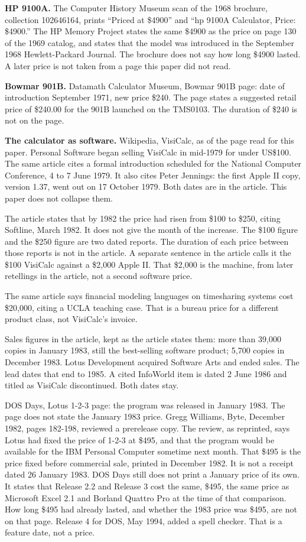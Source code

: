 \documentclass[
  10pt,
]{article}
\begin{document}
\textbf{HP 9100A.} The Computer History Museum scan of the 1968
brochure, collection 102646164, prints ``Priced at \$4900'' and ``hp
9100A Calculator, Price: \$4900.'' The HP Memory Project states the same
\$4900 as the price on page 130 of the 1969 catalog, and states that the
model was introduced in the September 1968 Hewlett-Packard Journal. The
brochure does not say how long \$4900 lasted. A later price is not taken
from a page this paper did not read.

\textbf{Bowmar 901B.} Datamath Calculator Museum, Bowmar 901B page: date
of introduction September 1971, new price \$240. The page states a
suggested retail price of \$240.00 for the 901B launched on the TMS0103.
The duration of \$240 is not on the page.

\textbf{The calculator as software.} Wikipedia, VisiCalc, as of the page
read for this paper. Personal Software began selling VisiCalc in
mid-1979 for under US\$100. The same article cites a formal introduction
scheduled for the National Computer Conference, 4 to 7 June 1979. It
also cites Peter Jennings: the first Apple II copy, version 1.37, went
out on 17 October 1979. Both dates are in the article. This paper does
not collapse them.

The article states that by 1982 the price had risen from \$100 to \$250,
citing Softline, March 1982. It does not give the month of the increase.
The \$100 figure and the \$250 figure are two dated reports. The
duration of each price between those reports is not in the article. A
separate sentence in the article calls it the \$100 VisiCalc against a
\$2,000 Apple II. That \$2,000 is the machine, from later retellings in
the article, not a second software price.

The same article says financial modeling languages on timesharing
systems cost \$20,000, citing a UCLA teaching case. That is a bureau
price for a different product class, not VisiCalc's invoice.

Sales figures in the article, kept as the article states them: more than
39,000 copies in January 1983, still the best-selling software product;
5,700 copies in December 1983. Lotus Development acquired Software Arts
and ended sales. The lead dates that end to 1985. A cited InfoWorld item
is dated 2 June 1986 and titled as VisiCalc discontinued. Both dates
stay.

DOS Days, Lotus 1-2-3 page: the program was released in January 1983.
The page does not state the January 1983 price. Gregg Williams, Byte,
December 1982, pages 182-198, reviewed a prerelease copy. The review, as
reprinted, says Lotus had fixed the price of 1-2-3 at \$495, and that
the program would be available for the IBM Personal Computer sometime
next month. That \$495 is the price fixed before commercial sale,
printed in December 1982. It is not a receipt dated 26 January 1983. DOS
Days still does not print a January price of its own. It states that
Release 2.2 and Release 3 cost the same, \$495, the same price as
Microsoft Excel 2.1 and Borland Quattro Pro at the time of that
comparison. How long \$495 had already lasted, and whether the 1983
price was \$495, are not on that page. Release 4 for DOS, May 1994,
added a spell checker. That is a feature date, not a price.
\end{document}
